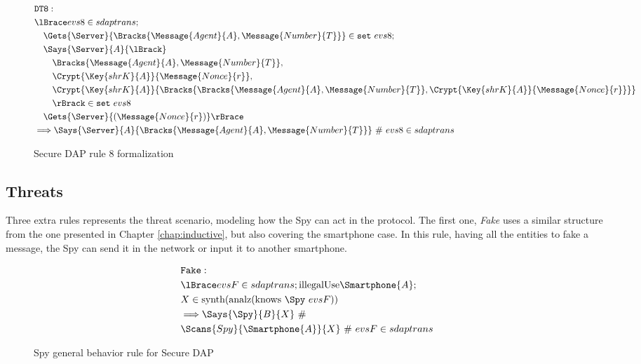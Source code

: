 \begin{figure}[!h]
  \begin{align*}
    & \texttt{DT8}: \newline \\
    & \lBrace evs8 \in sdaptrans; \\
    & \quad \Gets{\Server}{\Bracks{\Message{Agent}{A}, \Message{Number}{T}}} \in \texttt{set} \ evs8; \\
    & \quad \Says{\Server}{A}{\lBrack} \\
    & \qquad \Bracks{\Message{Agent}{A}, \Message{Number}{T}}, \\
    & \qquad \Crypt{\Key{shrK}{A}}{\Message{Nonce}{r}}, \\
    & \qquad \Crypt{\Key{shrK}{A}}{\Bracks{\Bracks{\Message{Agent}{A}, \Message{Number}{T}}, \Crypt{\Key{shrK}{A}}{\Message{Nonce}{r}}}} \\
    & \qquad \rBrack \in \texttt{set} \ evs8 \\
    & \quad \Gets{\Server}{(\Message{Nonce}{r})} \rBrace \\
    & \Longrightarrow \Says{\Server}{A}{\Bracks{\Message{Agent}{A}, \Message{Number}{T}}} \ \# \ evs8 \in sdaptrans
  \end{align*}
  \label{fig:dap-model-8}
  \caption{Secure DAP rule 8 formalization}
\end{figure}

\subsection{Threats}
Three extra rules represents the threat scenario, modeling how the Spy can act in the protocol. The first one, \textit{Fake} uses a similar structure from the one presented in Chapter \ref{chap:inductive}, but also covering the smartphone case. In this rule, having all the entities to fake a message, the Spy can send it in the network or input it to another smartphone.

\begin{figure}[!h]
  \begin{align*}
    & \texttt{Fake}: \newline \\
    & \lBrace evsF \in sdaptrans; \text{illegalUse} \Smartphone{A}; \\
    & X \in \text{synth}(\text{analz}(\text{knows} \ \Spy \ evsF)) \\
    & \Longrightarrow \Says{\Spy}{B}{X}\ \# \\ 
    & \Scans{Spy}{\Smartphone{A}}{X} \ \# \ evsF \in sdaptrans
  \end{align*}
  \label{fig:dap-model-threat-1}
  \caption{Spy general behavior rule for Secure DAP}
\end{figure}

